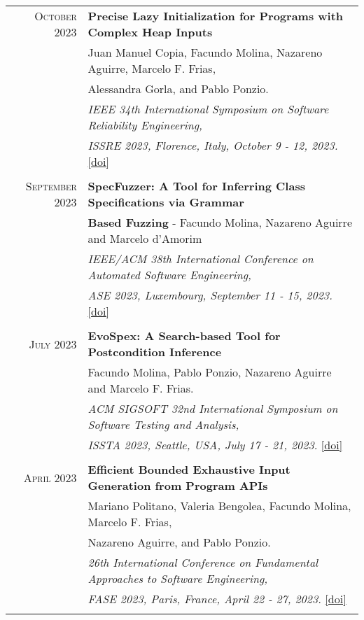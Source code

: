 \documentclass[a4paper,10pt]{article} %
\begin{document}
\begin{longtable}{rl}
\textsc{October} 2023  & \textbf{Precise Lazy Initialization for Programs with Complex Heap Inputs} \\
        & Juan Manuel Copia, Facundo Molina, Nazareno Aguirre, Marcelo F. Frias,\\
        & Alessandra Gorla, and Pablo Ponzio. \\
        & \textit{IEEE 34th International Symposium on Software Reliability Engineering,} \\
        & \textit{ISSRE 2023, Florence, Italy, October 9 - 12, 2023.} \href{https://doi.ieeecomputersociety.org/10.1109/ISSRE59848.2023.00080}{[doi]}\\ & \\

\textsc{September} 2023  & \textbf{SpecFuzzer: A Tool for Inferring Class Specifications via Grammar} \\
        & \textbf{Based Fuzzing} - Facundo Molina, Nazareno Aguirre and Marcelo d'Amorim \\
        & \textit{IEEE/ACM 38th International Conference on Automated Software Engineering,} \\
        & \textit{ASE 2023, Luxembourg, September 11 - 15, 2023.} \href{https://doi.ieeecomputersociety.org/10.1109/ASE56229.2023.00024}{[doi]}\\ & \\

\textsc{July} 2023  & \textbf{EvoSpex: A Search-based Tool for Postcondition Inference} \\
& Facundo Molina, Pablo Ponzio, Nazareno Aguirre and Marcelo F. Frias. \\
& \textit{ACM SIGSOFT 32nd International Symposium on Software Testing and Analysis,} \\
& \textit{ISSTA 2023, Seattle, USA, July 17 - 21, 2023.} \href{https://dl.acm.org/doi/abs/10.1145/3597926.3604928}{[doi]} \\ & \\

\textsc{April} 2023  & \textbf{Efficient Bounded Exhaustive Input Generation from Program APIs} \\
        & Mariano Politano, Valeria Bengolea, Facundo Molina, Marcelo F. Frias,\\
        & Nazareno Aguirre, and Pablo Ponzio. \\
	& \textit{26th International Conference on Fundamental Approaches to Software Engineering,} \\
        & \textit{FASE 2023, Paris, France, April 22 - 27, 2023.} \href{https://doi.org/10.1007/978-3-031-30826-0_6}{[doi]}\\ & \\


\end{longtable}
\end{document}
